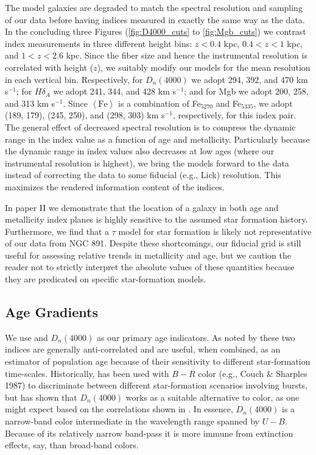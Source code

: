 The model galaxies are degraded to match the spectral resolution and
sampling of our \GP data before having indices measured in exactly the
same way as the data. In the concluding three Figures
(\ref{fig:D4000_cuts} to \ref{fig:Mgb_cuts}) we contrast index
measurements in three different height bins: $z<0.4$ kpc, $0.4<z<1$
kpc, and $1<z<2.6$ kpc. Since the fiber size and hence the
instrumental resolution is correlated with height ($z$), we suitably
modify our models for the mean resolution in each vertical
bin. Respectively, for $D_n(4000)$ we adopt 294, 392, and 470 km
s$^{-1}$; for $H\delta_A$ we adopt 241, 344, and 428 km s$^{-1}$;
and for Mgb we adopt 200, 258, and 313 km s$^{-1}$. Since
$\left<\mathrm{Fe}\right>$ is a combination of Fe$_{5270}$ and
Fe$_{5335}$, we adopt (189, 179), (245, 250), and (298, 303) km
s$^{-1}$, respectively, for this index pair.  The general effect of
decreased spectral resolution is to compress the dynamic range in the
index value as a function of age and metallicity. Particularly because
the dynamic range in index values also decreases at low ages (where
our instrumental resolution is highest), we bring the models forward
to the data instead of correcting the data to some fiducial (e.g.,
Lick) resolution. This maximizes the rendered information content of
the indices.

In paper II we demonstrate that the location of a galaxy in both age
and metallicity index planes is highly sensitive to the assumed star
formation history. Furthermore, we find that a $\tau$ model for star
formation is likely not representative of our data from NGC
891. Despite these shortcomings, our fiducial grid is still useful for
assessing relative trends in metallicity and age, but we caution the
reader not to strictly interpret the absolute values of these
quantities because they are predicated on specific star-formation
models. 

\subsection{Age Gradients}
\label{sec:age_grad}

We use \Hda and $D_n(4000)$ as our primary age indicators. As noted by
\citet{Hamilton85} these two indices are generally anti-correlated and
are useful, when combined, as an estimator of population age because
of their sensitivity to different star-formation time-scales.
Historically, \Hda has been used with $B-R$ color (e.g., Couch \&
Sharples 1987) to discriminate between different star-formation
scenarios involving bursts, but \citet{Balogh99} has shown that
$D_n(4000)$ works as a suitable alternative to color, as one might
expect based on the correlations shown in \citet{Hamilton85}. In
essence, $D_n(4000)$ is a narrow-band color intermediate in the
wavelength range spanned by $U-B$. Because of its relatively narrow
band-pass it is more immune from extinction effects, say, than
broad-band colors.

